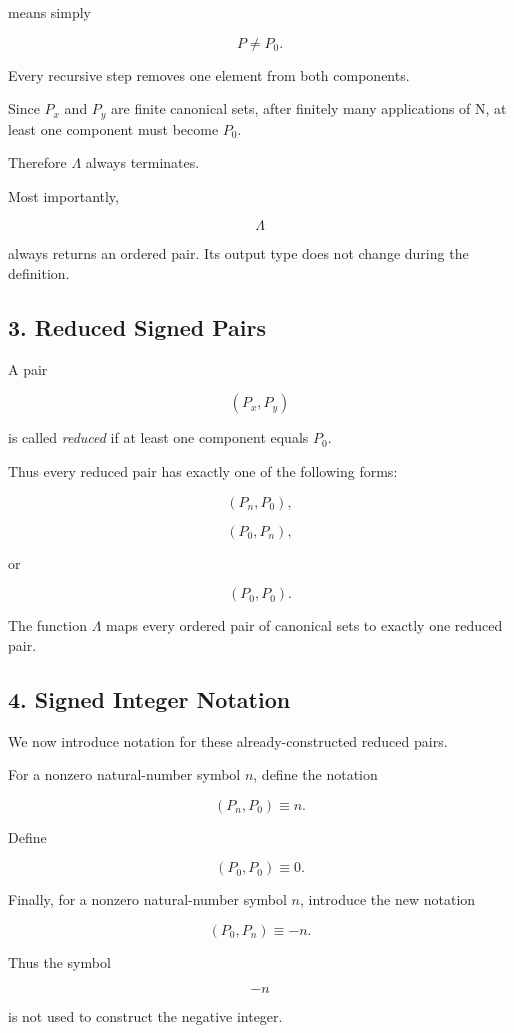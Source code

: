 \documentclass[12pt]{article}
\newcommand{\Nu}{\mathrm{N}}
\begin{document}
means simply

\[
P\neq P_0.
\]

Every recursive step removes one element from both components.

Since \(P_x\) and \(P_y\) are finite canonical sets, after finitely many applications of \(\Nu\), at least one component must become \(P_0\).

Therefore \(\Lambda\) always terminates.

Most importantly,

\[
\Lambda
\]

always returns an ordered pair. Its output type does not change during the definition.

\subsection*{3. Reduced Signed Pairs}

A pair

\[
(P_x,P_y)
\]

is called \emph{reduced} if at least one component equals \(P_0\).

Thus every reduced pair has exactly one of the following forms:

\[
(P_n,P_0),
\]

\[
(P_0,P_n),
\]

or

\[
(P_0,P_0).
\]

The function \(\Lambda\) maps every ordered pair of canonical sets to exactly one reduced pair.

\subsection*{4. Signed Integer Notation}

We now introduce notation for these already-constructed reduced pairs.

For a nonzero natural-number symbol \(n\), define the notation

\[
(P_n,P_0)\equiv n.
\]

Define

\[
(P_0,P_0)\equiv0.
\]

Finally, for a nonzero natural-number symbol \(n\), introduce the new notation

\[
\boxed{
(P_0,P_n)\equiv -n.
}
\]

Thus the symbol

\[
-n
\]

is not used to construct the negative integer.
\end{document}
